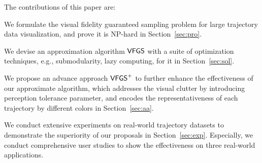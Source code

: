 The contributions of this paper are:
\squishlist
  \item We formulate the visual fidelity guaranteed sampling problem for large trajectory data visualization, and prove it is {NP-hard} in Section~\ref{sec:pro}.
  \item We devise an approximation algorithm $\mathsf{VFGS}$ with a suite of optimization techniques, e.g., submodularity, lazy computing, for it in Section~\ref{sec:sol}.
  \item We propose an advance approach $\mathsf{VFGS}^{+}$ to further enhance the effectiveness of our approximate algorithm, which {addresses} the visual clutter by introducing perception tolerance parameter,
  and encodes the representativeness of each {trajectory} by different colors in Section~\ref{sec:aa}.
  \item We conduct extensive experiments on real-world trajectory datasets to demonstrate the superiority of our proposals in Section~\ref{sec:exp}. Especially, we conduct comprehensive user studies to show {the} effectiveness on three real-world applications.
\squishend



%


